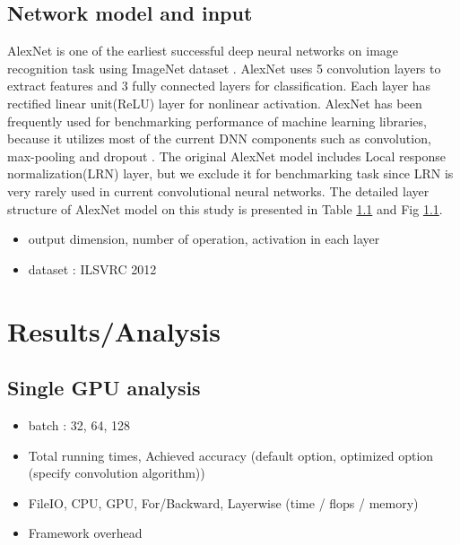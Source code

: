 \documentclass[conference]{IEEEtran}
\begin{document}
\subsection{Network model and input}
AlexNet \cite{} is one of the earliest successful deep neural networks on image recognition task using ImageNet dataset \cite{}.
AlexNet uses 5 convolution layers to extract features and 3 fully connected layers for classification.
Each layer has rectified linear unit(ReLU) layer for nonlinear activation.
AlexNet has been frequently used for benchmarking performance of machine learning libraries, because it utilizes most of the current DNN components such as convolution, max-pooling and dropout \cite{}.
The original AlexNet model includes Local response normalization(LRN) layer, but we exclude it for benchmarking task since LRN is very rarely used in current convolutional neural networks.
The detailed layer structure of AlexNet model on this study is presented in Table \ref{} and Fig \ref{}.

\begin{itemize}
  \item output dimension, number of operation, activation in each layer
  \item dataset : ILSVRC 2012
\end{itemize}

\section{Results/Analysis}

\subsection{Single GPU analysis}

\begin{itemize}
  \item batch : 32, 64, 128
  \item Total running times, Achieved accuracy (default option, optimized option (specify convolution algorithm))
  \item FileIO, CPU, GPU, For/Backward, Layerwise (time / flops / memory)
  \item Framework overhead
\end{itemize}
\end{document}
